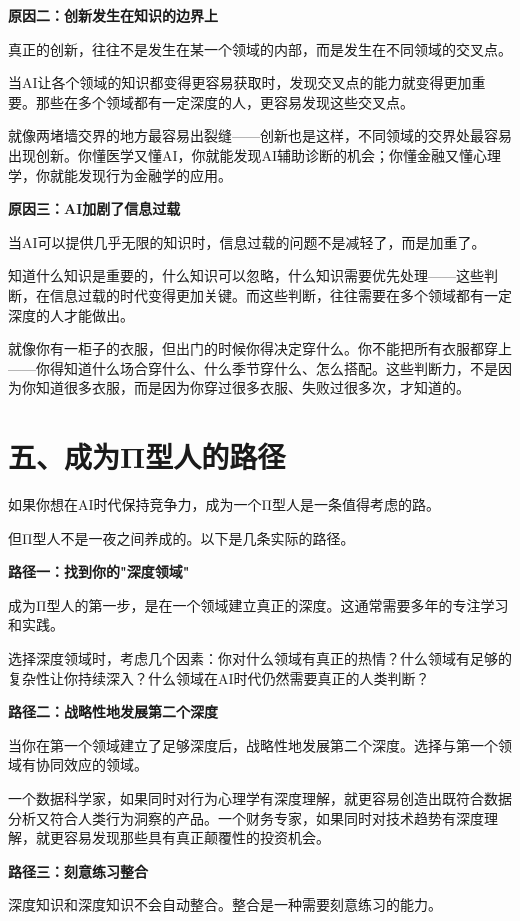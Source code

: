 \textbf{原因二：创新发生在知识的边界上}

真正的创新，往往不是发生在某一个领域的内部，而是发生在不同领域的交叉点。

当AI让各个领域的知识都变得更容易获取时，发现交叉点的能力就变得更加重要。那些在多个领域都有一定深度的人，更容易发现这些交叉点。

就像两堵墙交界的地方最容易出裂缝——创新也是这样，不同领域的交界处最容易出现创新。你懂医学又懂AI，你就能发现AI辅助诊断的机会；你懂金融又懂心理学，你就能发现行为金融学的应用。

\textbf{原因三：AI加剧了信息过载}

当AI可以提供几乎无限的知识时，信息过载的问题不是减轻了，而是加重了。

知道什么知识是重要的，什么知识可以忽略，什么知识需要优先处理——这些判断，在信息过载的时代变得更加关键。而这些判断，往往需要在多个领域都有一定深度的人才能做出。

就像你有一柜子的衣服，但出门的时候你得决定穿什么。你不能把所有衣服都穿上——你得知道什么场合穿什么、什么季节穿什么、怎么搭配。这些判断力，不是因为你知道很多衣服，而是因为你穿过很多衣服、失败过很多次，才知道的。

\section{五、成为Π型人的路径}


如果你想在AI时代保持竞争力，成为一个Π型人是一条值得考虑的路。

但Π型人不是一夜之间养成的。以下是几条实际的路径。

\textbf{路径一：找到你的"深度领域"}

成为Π型人的第一步，是在一个领域建立真正的深度。这通常需要多年的专注学习和实践。

选择深度领域时，考虑几个因素：你对什么领域有真正的热情？什么领域有足够的复杂性让你持续深入？什么领域在AI时代仍然需要真正的人类判断？

\textbf{路径二：战略性地发展第二个深度}

当你在第一个领域建立了足够深度后，战略性地发展第二个深度。选择与第一个领域有协同效应的领域。

一个数据科学家，如果同时对行为心理学有深度理解，就更容易创造出既符合数据分析又符合人类行为洞察的产品。一个财务专家，如果同时对技术趋势有深度理解，就更容易发现那些具有真正颠覆性的投资机会。

\textbf{路径三：刻意练习整合}

深度知识和深度知识不会自动整合。整合是一种需要刻意练习的能力。

